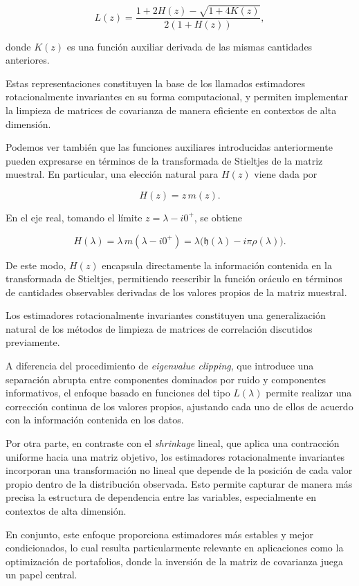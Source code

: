 \documentclass[letterpaper,12pt,oneside]{book}
\begin{document}
\[
L(z)=
\frac{1+2H(z)-\sqrt{1+4K(z)}}
{2(1+H(z))},
\]

donde $K(z)$ es una función auxiliar derivada de las mismas cantidades anteriores.

Estas representaciones constituyen la base de los llamados estimadores rotacionalmente invariantes en su forma computacional, y permiten implementar la limpieza de matrices de covarianza de manera eficiente en contextos de alta dimensión.

Podemos ver también que las funciones auxiliares introducidas anteriormente pueden expresarse en términos de la transformada de Stieltjes de la matriz muestral. En particular, una elección natural para $H(z)$ viene dada por

\[
H(z) = z\, m(z).
\]

En el eje real, tomando el límite $z=\lambda - i0^+$, se obtiene

\[
H(\lambda) = \lambda\, m(\lambda - i0^+)
= \lambda\bigl(\mathfrak{h}(\lambda) - i\pi \rho(\lambda)\bigr).
\]

De este modo, $H(z)$ encapsula directamente la información contenida en la transformada de Stieltjes, permitiendo reescribir la función oráculo en términos de cantidades observables derivadas de los valores propios de la matriz muestral.

Los estimadores rotacionalmente invariantes constituyen una generalización natural de los métodos de limpieza de matrices de correlación discutidos previamente.

A diferencia del procedimiento de \textit{eigenvalue clipping}, que introduce una separación abrupta entre componentes dominados por ruido y componentes informativos, el enfoque basado en funciones del tipo $L(\lambda)$ permite realizar una corrección continua de los valores propios, ajustando cada uno de ellos de acuerdo con la información contenida en los datos.

Por otra parte, en contraste con el \textit{shrinkage} lineal, que aplica una contracción uniforme hacia una matriz objetivo, los estimadores rotacionalmente invariantes incorporan una transformación no lineal que depende de la posición de cada valor propio dentro de la distribución observada. Esto permite capturar de manera más precisa la estructura de dependencia entre las variables, especialmente en contextos de alta dimensión.

En conjunto, este enfoque proporciona estimadores más estables y mejor condicionados, lo cual resulta particularmente relevante en aplicaciones como la optimización de portafolios, donde la inversión de la matriz de covarianza juega un papel central.
\end{document}
